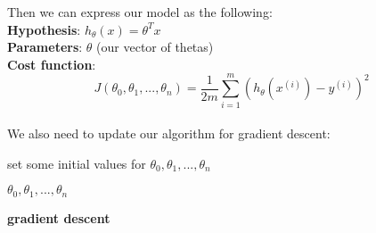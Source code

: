 \documentclass[11pt]{article}
\begin{document}
Then we can express our model as the following:\\

\textbf{Hypothesis}: $h_\theta(x) = \theta^Tx$\\

\textbf{Parameters}: $\theta$ (our vector of thetas)\\

\textbf{Cost function}: 
\[J(\theta_0, \theta_1,..., \theta_n) = \frac{1}{2m} \sum^m_{i=1}(h_\theta(x^{(i)}) - y^{(i)})^2\]\\

We also need to update our algorithm for gradient descent:

    \begin{algorithm}
    \SetAlgoLined
     set some initial values for $\theta_0, \theta_1, ..., \theta_n$ \\
    
	

    \Return $\theta_0, \theta_1, ..., \theta_n$

    \caption{\textbf{gradient descent}}
\end{algorithm} 
\end{document}
